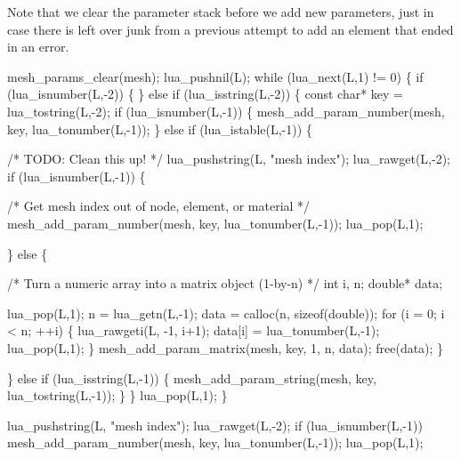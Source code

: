 Note that we clear the parameter stack before we add new parameters,
just in case there is left over junk from a previous attempt to add
an element that ended in an error.

\nwenddocs{}\endmoddef
mesh_params_clear(mesh);
lua_pushnil(L);
while (lua_next(L,1) != 0) \{
    if (lua_isnumber(L,-2)) \{
    \} else if (lua_isstring(L,-2)) \{
        const char* key = lua_tostring(L,-2);
        if (lua_isnumber(L,-1)) \{
            mesh_add_param_number(mesh, key, lua_tonumber(L,-1));
        \} else if (lua_istable(L,-1)) \{

            /* TODO: Clean this up! */
            lua_pushstring(L, "mesh index");
            lua_rawget(L,-2);
            if (lua_isnumber(L,-1)) \{

                /* Get mesh index out of node, element, or material */
                mesh_add_param_number(mesh, key, lua_tonumber(L,-1));
                lua_pop(L,1);

            \} else \{

                /* Turn a numeric array into a matrix object (1-by-n) */
                int i, n;
                double* data;

                lua_pop(L,1);
                n = lua_getn(L,-1);
                data = calloc(n, sizeof(double));
                for (i = 0; i < n; ++i) \{
                    lua_rawgeti(L, -1, i+1);
                    data[i] = lua_tonumber(L,-1);
                    lua_pop(L,1);
                \}
                mesh_add_param_matrix(mesh, key, 1, n, data);
                free(data);
            \}

        \} else if (lua_isstring(L,-1)) \{
            mesh_add_param_string(mesh, key, lua_tostring(L,-1));
        \}
    \}
    lua_pop(L,1);
\}

\nwendcode{}\nwdocspar

\nwenddocs{}\endmoddef
lua_pushstring(L, "mesh index");
lua_rawget(L,-2);
if (lua_isnumber(L,-1))
     mesh_add_param_number(mesh, key, lua_tonumber(L,-1));
lua_pop(L,1);
\nwendcode{}\nwdocspar

